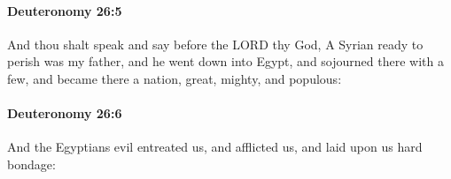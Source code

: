 		\paragraph{Deuteronomy 26:5} %
			\label{DEUTERONOMY-26-5}

			And thou shalt speak and say before the LORD thy God, A Syrian ready to perish was my father, and he went down into Egypt, and sojourned there with a few, and became there a nation, great, mighty, and populous:


		\paragraph{Deuteronomy 26:6} %
			\label{DEUTERONOMY-26-6}

			And the Egyptians evil entreated us, and afflicted us, and laid upon us hard bondage:


